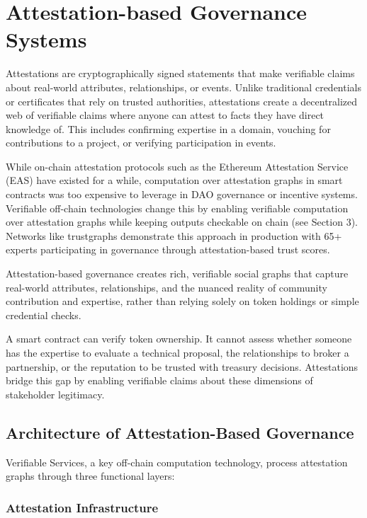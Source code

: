 \section{Attestation-based Governance Systems}

Attestations are cryptographically signed statements that make verifiable claims about real-world attributes, relationships, or events. Unlike traditional credentials or certificates that rely on trusted authorities, attestations create a decentralized web of verifiable claims where anyone can attest to facts they have direct knowledge of. This includes confirming expertise in a domain, vouching for contributions to a project, or verifying participation in events.

While on-chain attestation protocols such as the Ethereum Attestation Service (EAS) have existed for a while, computation over attestation graphs in smart contracts was too expensive to leverage in DAO governance or incentive systems. Verifiable off-chain technologies change this by enabling verifiable computation over attestation graphs while keeping outputs checkable on chain (see Section 3). Networks like trustgraphs demonstrate this approach in production with 65+ experts participating in governance through attestation-based trust scores.

Attestation-based governance creates rich, verifiable social graphs that capture real-world attributes, relationships, and the nuanced reality of community contribution and expertise, rather than relying solely on token holdings or simple credential checks.

A smart contract can verify token ownership. It cannot assess whether someone has the expertise to evaluate a technical proposal, the relationships to broker a partnership, or the reputation to be trusted with treasury decisions. Attestations bridge this gap by enabling verifiable claims about these dimensions of stakeholder legitimacy.

\subsection{Architecture of Attestation-Based Governance}

Verifiable Services, a key off-chain computation technology, process attestation graphs through three functional layers:

\subsubsection{Attestation Infrastructure}

